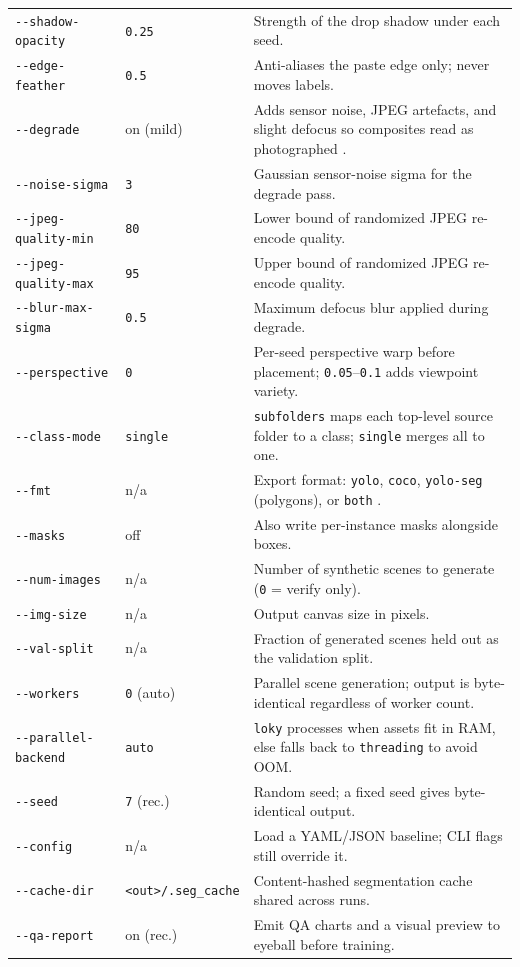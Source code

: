 \begin{singlespace}
\begin{longtable}{@{}l l p{6.6cm}@{}}
\texttt{-{}-shadow-opacity}     & \texttt{0.25}   & Strength of the drop shadow under each seed. \\
\texttt{-{}-edge-feather}       & \texttt{0.5}    & Anti-aliases the paste edge only; never moves labels. \\
\texttt{-{}-degrade}            & on (mild)       & Adds sensor noise, JPEG artefacts, and slight defocus so composites read as photographed \cite{shorten2019augmentation}. \\
\texttt{-{}-noise-sigma}        & \texttt{3}      & Gaussian sensor-noise sigma for the degrade pass. \\
\texttt{-{}-jpeg-quality-min}   & \texttt{80}     & Lower bound of randomized JPEG re-encode quality. \\
\texttt{-{}-jpeg-quality-max}   & \texttt{95}     & Upper bound of randomized JPEG re-encode quality. \\
\texttt{-{}-blur-max-sigma}     & \texttt{0.5}    & Maximum defocus blur applied during degrade. \\
\texttt{-{}-perspective}        & \texttt{0}      & Per-seed perspective warp before placement; \texttt{0.05}--\texttt{0.1} adds viewpoint variety. \\
\texttt{-{}-class-mode}         & \texttt{single} & \texttt{subfolders} maps each top-level source folder to a class; \texttt{single} merges all to one. \\
\texttt{-{}-fmt}                & n/a             & Export format: \texttt{yolo}, \texttt{coco}, \texttt{yolo-seg} (polygons), or \texttt{both} \cite{yolov8,lin2014coco}. \\
\texttt{-{}-masks}              & off             & Also write per-instance masks alongside boxes. \\
\texttt{-{}-num-images}         & n/a             & Number of synthetic scenes to generate (\texttt{0} = verify only). \\
\texttt{-{}-img-size}           & n/a             & Output canvas size in pixels. \\
\texttt{-{}-val-split}          & n/a             & Fraction of generated scenes held out as the validation split. \\
\texttt{-{}-workers}            & \texttt{0} (auto) & Parallel scene generation; output is byte-identical regardless of worker count. \\
\texttt{-{}-parallel-backend}   & \texttt{auto}   & \texttt{loky} processes when assets fit in RAM, else falls back to \texttt{threading} to avoid OOM. \\
\texttt{-{}-seed}               & \texttt{7} (rec.) & Random seed; a fixed seed gives byte-identical output. \\
\texttt{-{}-config}             & n/a             & Load a YAML/JSON baseline; CLI flags still override it. \\
\texttt{-{}-cache-dir}          & \texttt{<out>/.seg\_cache} & Content-hashed segmentation cache shared across runs. \\
\texttt{-{}-qa-report}          & on (rec.)       & Emit QA charts and a visual preview to eyeball before training. \\


\end{longtable}
\end{singlespace}
